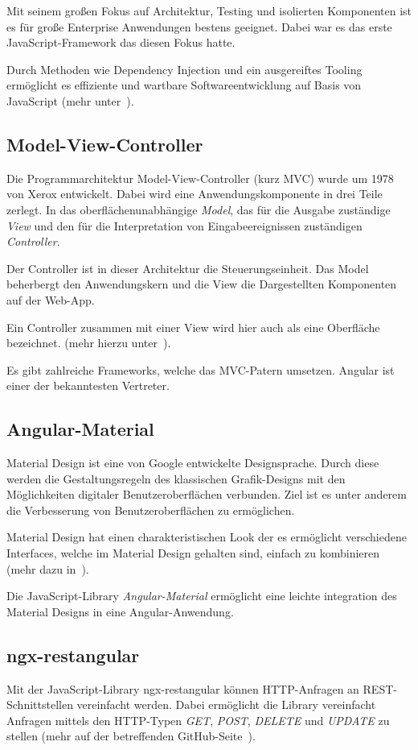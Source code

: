 Mit seinem großen Fokus auf Architektur, Testing und isolierten Komponenten ist es für große Enterprise Anwendungen
bestens geeignet. Dabei war es das erste JavaScript-Framework das diesen Fokus hatte.

Durch Methoden wie Dependency Injection und ein ausgereiftes Tooling ermöglicht es effiziente und wartbare
Softwareentwicklung auf Basis von JavaScript (mehr unter~\cite{book_grundlagen_angular}).

\subsection{Model-View-Controller}
Die Programmarchitektur Model-View-Controller (kurz MVC) wurde um 1978 von Xerox entwickelt. Dabei wird eine
Anwendungskomponente in drei Teile zerlegt. In das oberflächenunabhängige \textit{Model}, das für die
Ausgabe zuständige \textit{View} und den für die Interpretation von Eingabeereignissen zuständigen \textit{Controller}.

Der Controller ist in dieser Architektur die Steuerungseinheit. Das Model beherbergt den Anwendungskern und die View
die Dargestellten Komponenten auf der Web-App.

Ein Controller zusammen mit einer View wird hier auch als eine Oberfläche bezeichnet. (mehr hierzu
unter~\cite{book_grundlagen_mvc}).

Es gibt zahlreiche Frameworks, welche das MVC-Patern umsetzen. Angular ist einer der bekanntesten Vertreter.

\subsection{Angular-Material}
Material Design ist eine von Google entwickelte Designsprache. Durch diese werden die Gestaltungsregeln des klassischen
Grafik-Designs mit den Möglichkeiten digitaler Benutzeroberflächen verbunden. Ziel ist es unter anderem die Verbesserung
von Benutzeroberflächen zu ermöglichen.

Material Design hat einen charakteristischen Look der es ermöglicht verschiedene Interfaces, welche im Material Design
gehalten sind, einfach zu kombinieren (mehr dazu in~\cite{online_grundlagen_materialdesign}).

Die JavaScript-Library \textit{Angular-Material} ermöglicht eine leichte integration des Material Designs in eine
Angular-Anwendung.

\subsection{ngx-restangular}
Mit der JavaScript-Library ngx-restangular können HTTP-Anfragen an REST-Schnitt\-stellen vereinfacht werden. Dabei
ermöglicht die Library vereinfacht Anfragen mittels den HTTP-Typen \textit{GET}, \textit{POST}, \textit{DELETE} und
\textit{UPDATE} zu stellen (mehr auf der betreffenden GitHub-Seite~\cite{online_grundlagen_restangular}).

